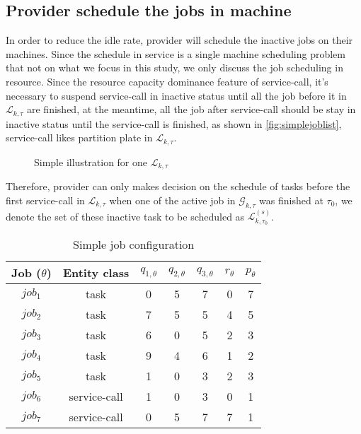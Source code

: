 \subsection{Provider schedule the jobs in machine} %
\label{sub:schedule_the_jobs_in_machine}
In order to reduce the idle rate, provider will schedule the inactive jobs on their machines. Since the schedule in service is a single machine scheduling problem that not on  what we focus in this study, we only discuss the job scheduling in resource. Since the  resource capacity dominance feature of service-call, it's necessary to suspend service-call in inactive status until all the job before it in $\mathcal{L}_{k,\tau}$ are finished, at the meantime, all the job after service-call should be stay in inactive status until the service-call is finished, as shown in \autoref{fig:simplejoblist}, service-call likes partition plate in $\mathcal{L}_{k,\tau}$.
\begin{figure}[htbp]
	\centering
    \large
	\resizebox{.7\textwidth}{!}{}
	\caption{Simple illustration for one $\mathcal{L}_{k,\tau}$}
	\label{fig:simplejoblist}
\end{figure}
Therefore, provider can only makes decision on the schedule of tasks before the first service-call in $\mathcal{L}_{k,\tau}$ when one of the active job in $\mathcal{G}_{k,\tau}$ was finished at $\tau_0$, we denote the set of these inactive task to be scheduled as $\mathcal{L}^{(s)}_{k,\tau_0}$.

\begin{table}[htbp]
  \centering
  \scriptsize
  \caption{Simple job configuration}
    \begin{tabular}{ccccccc}
    \toprule
    Job ($\theta$) & Entity class& $q_{1,\theta}$ & $q_{2,\theta}$ & $q_{3,\theta}$ & $r_\theta$ & $p_\theta$ \\
    \midrule
    $job_1$ & task& 0     & 5     & 7     & 0     & 7 \\
    $job_2$ & task& 7     & 5     & 5     & 4     & 5 \\
    $job_3$ & task& 6     & 0     & 5     & 2     & 3 \\
    $job_4$ & task& 9	 & 4  & 6 & 1 &2 \\
    $job_5$ & task& 1 & 0 & 3 & 2 & 3\\
    $job_6$ & service-call& 1     & 0     & 3    & 0     & 1 \\
    $job_7$ & service-call& 0     & 5     & 7     & 7     & 1 \\
    \bottomrule
    \end{tabular}%
  \label{tab:simplejobconfiguration}%
\end{table}%


